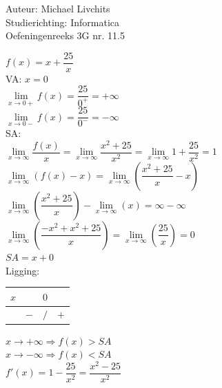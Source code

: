 \documentclass[a4paper]{article}
\begin{document}
  
\noindent \large Auteur: Michael Livchits \\
\noindent \large Studierichting: Informatica\\
\noindent \large Oefeningenreeks 3G nr. 11.5\\

\medskip

\normalsize

$f(x) = x+ \dfrac{25}{x}$\\

VA: $x = 0$\\

$\lim\limits_{x\rightarrow 0+} f(x) = \dfrac{25}{0^+} = +\infty$\\

$\lim\limits_{x\rightarrow 0-} f(x) = \dfrac{25}{0^-} = -\infty$\\

SA:\\

$\lim\limits_{x\rightarrow \infty} \dfrac{f(x)}{x} = \lim\limits_{x\rightarrow \infty} \dfrac{x^2+25}{x^2} = \lim\limits_{x\rightarrow \infty} 1+ \dfrac{25}{x^2} = 1$\\

$\lim\limits_{x\rightarrow \infty} (f(x) - x) = \lim\limits_{x\rightarrow \infty} \left(\dfrac{x^2+25}{x} - x\right)$\\

$\lim\limits_{x\rightarrow \infty} \left(\dfrac{x^2+25}{x}\right) - \lim\limits_{x\rightarrow \infty} (x) = \infty - \infty$\\

$\lim\limits_{x\rightarrow \infty} \left(\dfrac{-x^2+x^2+25}{x}\right) = \lim\limits_{x\rightarrow \infty} \left(\dfrac{25}{x}\right) = 0$\\

$SA = x+ 0$\\

Ligging:
\begin{tabular}{c|ccc}
$x$       &     &   $0$   &   \\ \hline
          &  $-$  &   $/$   & $+$ \\
\end{tabular}

$x \rightarrow +\infty \Rightarrow f(x) > SA$\\

$x \rightarrow -\infty \Rightarrow f(x) < SA$\\

$f'(x) = 1 - \dfrac{25}{x^2}=\dfrac{x^2-25}{x^2}$\\
\end{document}
